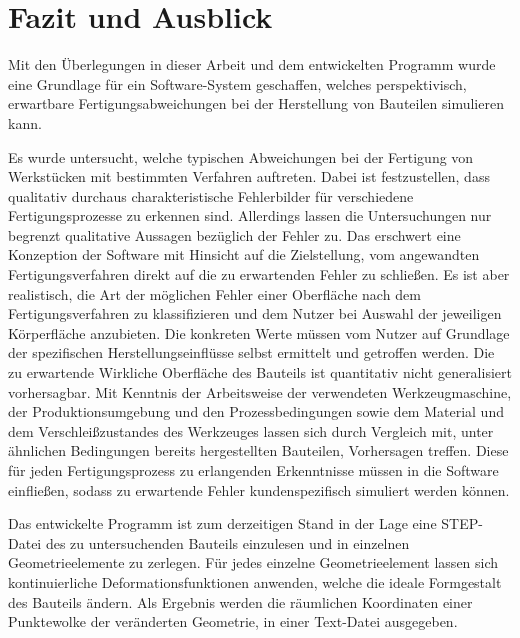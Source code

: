 \section{Fazit und Ausblick}

Mit den Überlegungen in dieser Arbeit und dem entwickelten Programm wurde eine Grundlage für ein Software-System geschaffen, welches perspektivisch, erwartbare Fertigungsabweichungen bei der Herstellung von Bauteilen simulieren kann.

Es wurde untersucht, welche typischen Abweichungen bei der Fertigung von Werkstücken mit bestimmten Verfahren auftreten. Dabei ist festzustellen, dass qualitativ durchaus charakteristische Fehlerbilder für verschiedene Fertigungsprozesse zu erkennen sind. Allerdings lassen die Untersuchungen nur begrenzt qualitative Aussagen bezüglich der Fehler zu. Das erschwert eine Konzeption der Software mit Hinsicht auf die Zielstellung, vom angewandten Fertigungsverfahren direkt auf die zu erwartenden Fehler zu schließen. Es ist aber realistisch, die Art der möglichen Fehler einer Oberfläche nach dem Fertigungsverfahren zu klassifizieren und dem Nutzer bei Auswahl der jeweiligen Körperfläche anzubieten. Die konkreten Werte müssen vom Nutzer auf Grundlage der spezifischen Herstellungseinflüsse selbst ermittelt und getroffen werden. Die zu erwartende Wirkliche Oberfläche des Bauteils ist quantitativ nicht generalisiert vorhersagbar. Mit Kenntnis der Arbeitsweise der verwendeten Werkzeugmaschine, der Produktionsumgebung und den Prozessbedingungen sowie dem Material und dem Verschleißzustandes des Werkzeuges lassen sich durch Vergleich mit, unter ähnlichen Bedingungen bereits hergestellten Bauteilen, Vorhersagen treffen.
Diese für jeden Fertigungsprozess zu erlangenden Erkenntnisse müssen in die Software einfließen, sodass zu erwartende Fehler kundenspezifisch simuliert werden können. 

Das entwickelte Programm ist zum derzeitigen Stand in der Lage eine STEP-Datei des zu untersuchenden Bauteils einzulesen und in einzelnen Geometrieelemente zu zerlegen. Für jedes einzelne Geometrieelement lassen sich kontinuierliche Deformationsfunktionen anwenden, welche die ideale Formgestalt des Bauteils ändern. Als Ergebnis werden die räumlichen Koordinaten einer Punktewolke der veränderten Geometrie, in einer Text-Datei ausgegeben. 

